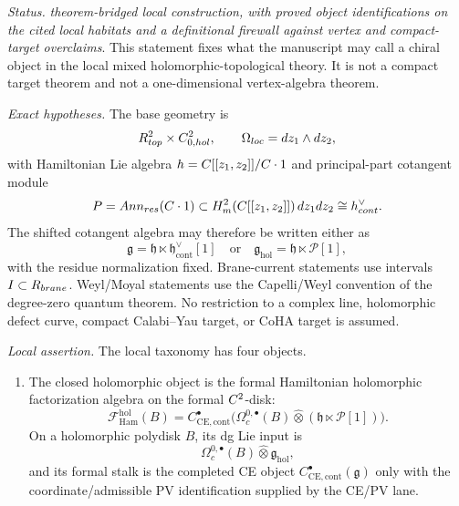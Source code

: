 \begin{stmt}\label{thm:lane-local-chiral-taxonomy}
  \emph{Status.} \emph{theorem-bridged local construction, with proved
  object identifications on the cited local habitats and a definitional
  firewall against vertex and compact-target overclaims}.  This statement
  fixes what the manuscript may call a chiral object in the local mixed
  holomorphic-topological theory.  It is not a compact target theorem and
  not a one-dimensional vertex-algebra theorem.

  \emph{Exact hypotheses.} The base geometry is
  \[
    R^2_{top}\times
    C^2_{0,hol},
    \qquad
    \Omega_{loc}=dz_1\wedge dz_2,
  \]
  with Hamiltonian Lie algebra
  \(h=C[[z_1,z_2]]/C\cdot1\) and principal-part cotangent
  module
  \[
    P=Ann_{res}(C\cdot1)
    \subset H^2_{m}(C[[z_1,z_2]])\,dz_1dz_2
    \cong h^\vee_{cont} .
  \]
  The shifted cotangent algebra may therefore be written either as
  \[
    \mathfrak g=\mathfrak h\ltimes
    \mathfrak h^\vee_{\mathrm{cont}}[1]
    \quad\text{or}\quad
    \mathfrak g_{\mathrm{hol}}=\mathfrak h\ltimes\mathcal P[1],
  \]
  with the residue normalization fixed.  Brane-current statements use
  intervals \(I\subset R_{brane}\).  Weyl/Moyal statements use
  the Capelli/Weyl convention of the degree-zero quantum theorem.  No
  restriction to a complex line, holomorphic defect curve, compact
  Calabi--Yau target, or CoHA target is assumed.

  \emph{Local assertion.} The local taxonomy has four objects.
  \begin{enumerate}[label=(\arabic*)]
    \item The closed holomorphic object is the formal Hamiltonian
      holomorphic factorization algebra on the formal \(C^2\)-disk:
      \[
        \mathcal F_{\mathrm{Ham}}^{\mathrm{hol}}(B)
        =
        C^\bullet_{\mathrm{CE},\mathrm{cont}}
        \bigl(\Omega^{0,\bullet}_c(B)\widehat\otimes
        (\mathfrak h\ltimes\mathcal P[1])\bigr).
      \]
      On a holomorphic polydisk \(B\), its dg Lie input is
      \[
        \Omega^{0,\bullet}_c(B)\widehat\otimes
        \mathfrak g_{\mathrm{hol}},
      \]
      and its formal stalk is the completed CE object
      \(C^\bullet_{\mathrm{CE},\mathrm{cont}}(\mathfrak g)\) only with the
      coordinate/admissible PV identification supplied by the CE/PV lane.


\end{enumerate}
\end{stmt}
